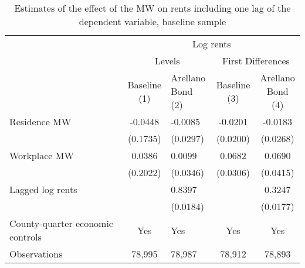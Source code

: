 \begin{table}[hbt!]
    \centering
    \caption{Estimates of the effect of the MW on rents including one lag of the 
             dependent variable, baseline sample}
    \label{tab:arellano_bond}

    \begin{tabular}{@{}lclcc@{}}
        \toprule
                                             & \multicolumn{4}{c}{Log rents}                                                       \\ \cmidrule(l){2-5} 
                                             & \multicolumn{2}{c}{Levels}               & \multicolumn{2}{c}{First Differences}    \\ \cmidrule(l){2-5} 
        \multicolumn{1}{c}{}                 & \shortstack{Baseline\\(1)} 
                                             & \shortstack{Arellano\\Bond (2)} 
                                             & \shortstack{Baseline\\(3)} 
                                             & \shortstack{Arellano\\Bond (4)}                                                     \\ \midrule
        Residence MW                         & -0.0448                  & -0.0085               & -0.0201                  & -0.0183               \\
                                             & (0.1735)                & (0.0297)             & (0.0200)                & (0.0268)             \\
        Workplace MW                         & 0.0386                  & 0.0099               & 0.0682                  & 0.0690               \\
                                             & (0.2022)                & (0.0346)             & (0.0306)                & (0.0415)             \\
        Lagged log rents                     &                      & 0.8397               &                      & 0.3247               \\
                                             &                      & (0.0184)             &                      & (0.0177)             \\ \midrule
        County-quarter economic controls     & Yes                  & Yes               & Yes                  & Yes               \\
        Observations                         & 78,995                 & 78,987              & 78,912                 & 78,893              \\ \bottomrule
    \end{tabular}


\end{table}

